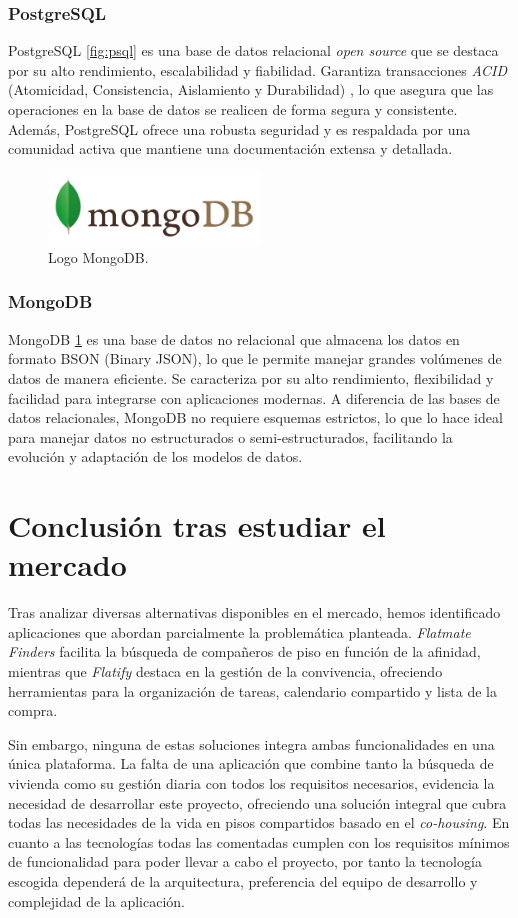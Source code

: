 \subsubsection*{PostgreSQL}
PostgreSQL \ref{fig:psql} es una base de datos relacional \textit{open source} que se destaca por su alto rendimiento, escalabilidad y fiabilidad. Garantiza transacciones \textit{ACID} (Atomicidad, Consistencia, Aislamiento y Durabilidad) \cite{cics-acid}, lo que asegura que las operaciones en la base de datos se realicen de forma segura y consistente. Además, PostgreSQL ofrece una robusta seguridad y es respaldada por una comunidad activa que mantiene una documentación extensa y detallada.
\begin{figure}[H]
    \centering
    \includegraphics[width=0.5\textwidth]{fotos/mongo.png}
    \caption{Logo MongoDB\textbf{}.}
    \label{fig:mongo}
\end{figure}
\subsubsection*{MongoDB}
MongoDB \ref{fig:mongo} es una base de datos no relacional que almacena los datos en formato BSON (Binary JSON), lo que le permite manejar grandes volúmenes de datos de manera eficiente. Se caracteriza por su alto rendimiento, flexibilidad y facilidad para integrarse con aplicaciones modernas. A diferencia de las bases de datos relacionales, MongoDB no requiere esquemas estrictos, lo que lo hace ideal para manejar datos no estructurados o semi-estructurados, facilitando la evolución y adaptación de los modelos de datos.

\section{Conclusión tras estudiar el mercado}
Tras analizar diversas alternativas disponibles en el mercado, hemos identificado aplicaciones que abordan parcialmente la problemática planteada. \textit{Flatmate Finders} facilita la búsqueda de compañeros de piso en función de la afinidad, mientras que \textit{Flatify} destaca en la gestión de la convivencia, ofreciendo herramientas para la organización de tareas, calendario compartido y lista de la compra.

Sin embargo, ninguna de estas soluciones integra ambas funcionalidades en una única plataforma. La falta de una aplicación que combine tanto la búsqueda de vivienda como su gestión diaria con todos los requisitos necesarios, evidencia la necesidad de desarrollar este proyecto, ofreciendo una solución integral que cubra todas las necesidades de la vida en pisos compartidos basado en el \emph{co-housing}. En cuanto a las tecnologías todas las comentadas cumplen con los requisitos mínimos de funcionalidad para poder llevar a cabo el proyecto, por tanto la tecnología escogida dependerá de la arquitectura, preferencia del equipo de desarrollo y complejidad de la aplicación.
